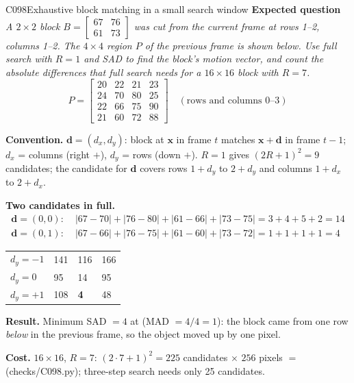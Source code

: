 \begin{solvedidea}{C098}{Exhaustive block matching in a small search window}
\noindent\textbf{Expected question} \quad\emph{A $2\times2$ block $B=\left[\begin{smallmatrix}67&76\\61&73\end{smallmatrix}\right]$
was cut from the current frame at rows 1--2, columns 1--2. The $4\times4$ region $P$ of the previous frame is
shown below. Use full search with $R=1$ and SAD to find the block's motion vector, and count the absolute differences
that full search needs for a $16\times16$ block with $R=7$.}
\[ P=\begin{bmatrix}20&22&21&23\\24&70&80&25\\22&66&75&90\\21&60&72&88\end{bmatrix}\quad(\text{rows and columns } 0\text{--}3) \]

\noindent\textbf{Convention.} $\mathbf d=(d_x,d_y)$: block at $\mathbf x$ in frame $t$ matches $\mathbf x+\mathbf d$ in
frame $t-1$; $d_x$ = columns (right $+$), $d_y$ = rows (down $+$). $R=1$ gives $(2R+1)^2=9$ candidates; the candidate
for $\mathbf d$ covers rows $1+d_y$ to $2+d_y$ and columns $1+d_x$ to $2+d_x$.

\noindent\textbf{Two candidates in full.}
\begin{align*}
\mathbf d=(0,0):&\;|67-70|+|76-80|+|61-66|+|73-75|=3+4+5+2=14\\
\mathbf d=(0,1):&\;|67-66|+|76-75|+|61-60|+|73-72|=1+1+1+1=4
\end{align*}

{\small\zebra
\begin{tabularx}{\linewidth}{YYYY}\toprule
{} &  &  & \\\midrule
$d_y=-1$ & 141 & 116 & 166\\
$d_y=0$ & 95 & 14 & 95\\
$d_y=+1$ & 108 & \textbf{4} & 48\\\bottomrule
\end{tabularx}\par}

\noindent\textbf{Result.} Minimum SAD $=4$ at  (MAD $=4/4=1$): the block came from
one row \emph{below} in the previous frame, so the object moved up by one pixel.

\noindent\textbf{Cost.} $16\times16$, $R=7$: $(2\cdot7+1)^2=225$ candidates $\times$ $256$ pixels
$=$  (checks/C098.py); three-step search needs only 25 candidates.
\end{solvedidea}
